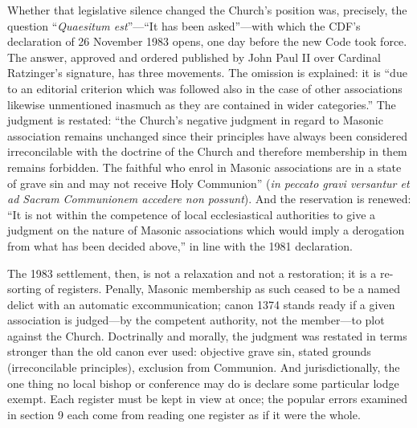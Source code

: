 Whether that legislative silence changed the Church's position was, precisely, the question ``\emph{Quaesitum est}''---``It has been asked''---with which the CDF's declaration of 26 November 1983 opens, one day before the new Code took force. The answer, approved and ordered published by John Paul II over Cardinal Ratzinger's signature, has three movements. The omission is explained: it is ``due to an editorial criterion which was followed also in the case of other associations likewise unmentioned inasmuch as they are contained in wider categories.'' The judgment is restated: ``the Church's negative judgment in regard to Masonic association remains unchanged since their principles have always been considered irreconcilable with the doctrine of the Church and therefore membership in them remains forbidden. The faithful who enrol in Masonic associations are in a state of grave sin and may not receive Holy Communion'' (\emph{in peccato gravi versantur et ad Sacram Communionem accedere non possunt}). And the reservation is renewed: ``It is not within the competence of local ecclesiastical authorities to give a judgment on the nature of Masonic associations which would imply a derogation from what has been decided above,'' in line with the 1981 declaration.

The 1983 settlement, then, is not a relaxation and not a restoration; it is a re-sorting of registers. Penally, Masonic membership as such ceased to be a named delict with an automatic excommunication; canon 1374 stands ready if a given association is judged---by the competent authority, not the member---to plot against the Church. Doctrinally and morally, the judgment was restated in terms stronger than the old canon ever used: objective grave sin, stated grounds (irreconcilable principles), exclusion from Communion. And jurisdictionally, the one thing no local bishop or conference may do is declare some particular lodge exempt. Each register must be kept in view at once; the popular errors examined in section 9 each come from reading one register as if it were the whole.
